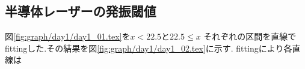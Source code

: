 \subsection{半導体レーザーの発振閾値}
図\ref{fig:graph/day1/day1_01.tex}を$x<22.5$と$22.5\leq x$
それぞれの区間を直線でfittingした.その結果を図\ref{fig:graph/day1/day1_02.tex}に示す.
fittingにより各直線は
